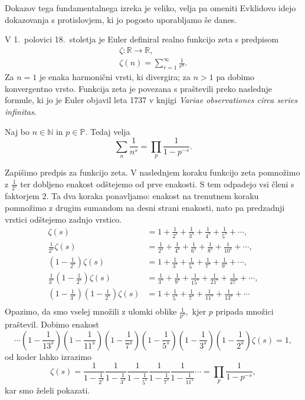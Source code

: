 \documentclass[mat1]{fmfdelo}
\begin{document}
Dokazov tega fundamentalnega izreka je veliko, velja pa omeniti Evklidovo idejo dokazovanja s protislovjem, ki jo pogosto uporabljamo še danes.

V 1.~polovici 18.~stoletja je Euler definiral realno funkcijo zeta s predpisom
\begin{align}
\zeta \colon \mathbb{R} \rightarrow \mathbb{R}, \nonumber \\
\zeta(n) = \sum_{r=1}^{\infty}\frac{1}{r^n}.
\end{align}
Za $n=1$ je enaka harmonični vrsti, ki divergira; za $n>1$ pa dobimo konvergentno vrsto. Funkcija zeta je povezana s praštevili preko naslednje formule, ki jo je Euler objavil leta 1737 v knjigi \emph{Variae observationes circa series infinitas}.

\begin{izrek}
\label{izr:EulProdukt}
Naj bo $n\in\mathbb{N}$ in $p\in\mathbb{P}$. Tedaj velja
\begin{equation}
\sum_{n}\frac{1}{n^s} = \prod_{p}\frac{1}{1-p^{-s}}.
\end{equation}
\end{izrek}

\begin{dokaz}
Zapišimo predpis za funkcijo zeta. V naslednjem koraku funkcijo zeta pomnožimo z $\frac{1}{2^s}$ ter dobljeno enakost odštejemo od prve enakosti. S tem odpadejo vsi členi s faktorjem $2$. Ta dva koraka ponavljamo: enakost na trenutnem koraku pomnožimo z drugim sumandom na desni strani enakosti, nato pa predzadnji vrstici odštejemo zadnjo vrstico.
\begin{align*}
	\zeta(s) &= 1 + \frac{1}{2^s} + \frac{1}{3^s} + \frac{1}{4^s} + \frac{1}{5^s} + \cdots, \nonumber \\
	\frac{1}{2^s} \zeta(s) &= \frac{1}{2^s} + \frac{1}{4^s} + \frac{1}{6^s} + \frac{1}{8^s} + \frac{1}{10^s} + \cdots, \nonumber \\
	\left(1-\frac{1}{2^s}\right) \zeta(s) &= 1 + \frac{1}{3^s} + \frac{1}{5^s} + \frac{1}{7^s} + \frac{1}{9^s} + \cdots, \nonumber \\
	\frac{1}{3^s} \left(1-\frac{1}{2^s}\right) \zeta(s) &= \frac{1}{3^s} + \frac{1}{9^s} + \frac{1}{15^s} + \frac{1}{21^s} + \frac{1}{27^s} + \cdots, \nonumber \\
	\left(1-\frac{1}{3^s}\right)\left (1-\frac{1}{2^s}\right) \zeta(s) &= 1 + \frac{1}{5^s} + \frac{1}{7^s} + \frac{1}{11^s} + \frac{1}{13^s} + \cdots \nonumber \\
\end{align*}
Opazimo, da smo vselej množili z ulomki oblike $\frac{1}{p^s},$ kjer $p$ pripada množici praštevil. Dobimo enakost
	\[ \cdots \left(1-\frac{1}{13^s}\right) \left(1-\frac{1}{11^s}\right) \left(1-\frac{1}{7^s}\right) \left(1-\frac{1}{5^s}\right) \left(1-\frac{1}{3^s}\right) 		\left(1-\frac{1}{2^s}\right) \zeta(s) = 1, \]
od koder lahko izrazimo
	\[ \zeta(s) = \frac{1}{1-\frac{1}{2^s}} \frac{1}{1-\frac{1}{3^s}} \frac{1}{1-\frac{1}{5^s}} \frac{1}{1-\frac{1}{7^s}} \frac{1}{1-\frac{1}{11^s}} \cdots = 		\prod_{p}\frac{1}{1-p^{-s}}, \]
kar smo želeli pokazati.
\end{dokaz}
\end{document}
